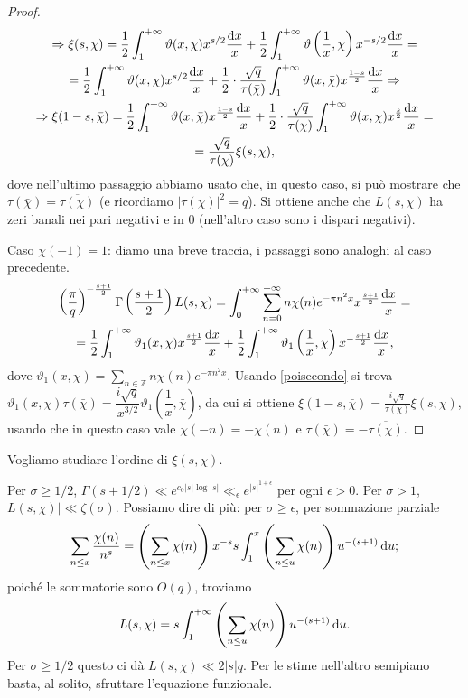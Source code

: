 \begin{proof}
\begin{gather*}
    \Rightarrow \xi(s,\chi)=\frac{1}{2}\int_1^{+\infty} \vartheta(x,\chi)x^{s/2}\frac{\mathop{}\!\mathrm{d} x}{x}+\frac{1}{2}\int_1^{+\infty} \vartheta\left(\frac{1}{x},\chi\right)x^{-s/2}\frac{\mathop{}\!\mathrm{d} x}{x}= \\
    =\frac{1}{2}\int_1^{+\infty} \vartheta(x,\chi)x^{s/2}\frac{\mathop{}\!\mathrm{d} x}{x}+\frac{1}{2}\cdot\frac{\sqrt{q}}{\tau(\bar{\chi})}\int_1^{+\infty} \vartheta(x,\bar{\chi})x^{\frac{1-s}{2}}\frac{\mathop{}\!\mathrm{d} x}{x} \Rightarrow \\
    \Rightarrow \xi(1-s,\bar{\chi})=\frac{1}{2}\int_1^{+\infty} \vartheta(x,\bar{\chi})x^{\frac{1-s}{2}}\frac{\mathop{}\!\mathrm{d} x}{x}+\frac{1}{2}\cdot\frac{\sqrt{q}}{\tau(\chi)}\int_1^{+\infty} \vartheta(x,\chi)x^{\frac{s}{2}}\frac{\mathop{}\!\mathrm{d} x}{x}= \\
    =\frac{\sqrt{q}}{\tau(\chi)}\xi(s,\chi),
  \end{gather*}
  dove nell'ultimo passaggio abbiamo usato che, in questo caso, si può mostrare che $\tau(\bar{\chi})=\overline{\tau(\chi)}$ (e ricordiamo $|\tau(\chi)|^2=q$). Si ottiene anche che $L(s,\chi)$ ha zeri banali nei pari negativi e in $0$ (nell'altro caso sono i dispari negativi).

  Caso $\chi(-1)=1$: diamo una breve traccia, i passaggi sono analoghi al caso precedente.
  \begin{gather*}
    \left(\frac{\pi}{q}\right)^{-\frac{s+1}{2}}\Gamma\left(\frac{s+1}{2}\right)L(s,\chi)=\int_0^{+\infty}\sum_{n=0}^{+\infty} n\chi(n)e^{-\pi n^2x}x^{\frac{s+1}{2}}\frac{\mathop{}\!\mathrm{d} x}{x}= \\
    =\frac{1}{2}\int_1^{+\infty}\vartheta_1(x,\chi)x^{\frac{s+1}{2}}\frac{\mathop{}\!\mathrm{d} x}{x}+\frac{1}{2}\int_1^{+\infty} \vartheta_1\left(\frac{1}{x},\chi\right)x^{-\frac{s+1}{2}}\frac{\mathop{}\!\mathrm{d} x}{x},
  \end{gather*}
  dove $\displaystyle \vartheta_1(x,\chi)=\sum_{n \in \mathbb{Z}} n\chi(n)e^{-\pi n^2x}$. Usando \eqref{poisecondo} si trova $\vartheta_1(x,\chi)\tau(\bar{\chi})=\dfrac{i\sqrt{q}}{x^{3/2}}\vartheta_1\left(\dfrac{1}{x},\bar{\chi}\right)$,
  da cui si ottiene $\xi(1-s,\bar{\chi})=\frac{i\sqrt{q}}{\tau(\chi)}\xi(s,\chi)$, usando che in questo caso vale $\chi(-n)=-\chi(n)$ e $\tau(\bar{\chi})=-\overline{\tau(\chi)}$.
\end{proof}

Vogliamo studiare l'ordine di $\xi(s,\chi)$.

Per $\sigma \ge 1/2$, $\Gamma(s+1/2) \ll e^{c_0|s|\log{|s|}} \ll_{\epsilon} e^{|s|^{1+\epsilon}}$ per ogni $\epsilon>0$. Per $\sigma>1$, $L(s,\chi)| \ll \zeta(\sigma)$. Possiamo dire di più: per $\sigma \ge \epsilon$, per sommazione parziale
$$\sum_{n \le x} \frac{\chi(n)}{n^s}=\left(\sum_{n \le x}\chi(n)\right)x^{-s}s\int_1^x\left(\sum_{n \le u}\chi(n)\right)u^{-(s+1)}\mathop{}\!\mathrm{d} u;$$
poiché le sommatorie sono $O(q)$, troviamo
$$L(s,\chi)=s\int_1^{+\infty} \left(\sum_{n \le u}\chi(n)\right)u^{-(s+1)}\mathop{}\!\mathrm{d} u.$$
Per $\sigma \ge 1/2$ questo ci dà $L(s,\chi) \ll 2|s|q$. Per le stime nell'altro semipiano basta, al solito, sfruttare l'equazione funzionale.

